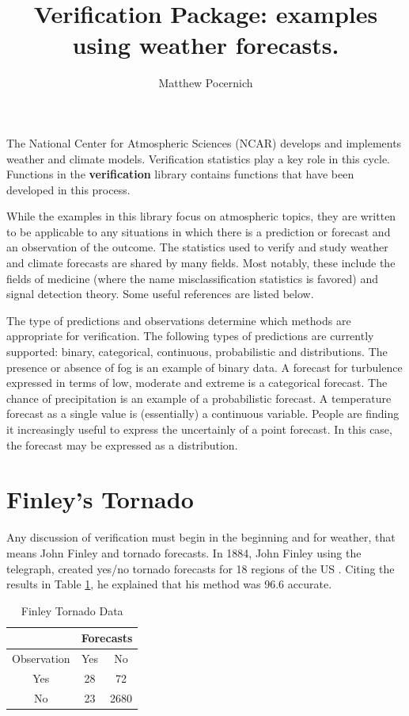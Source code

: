 \documentclass{article}
\title{Verification Package: examples using weather forecasts.}
\author{Matthew Pocernich}
\begin{document}
\maketitle
The National Center for Atmospheric Sciences (NCAR) develops and
implements weather and climate models.
Verification statistics play a key role in this cycle.
Functions in the \textbf{verification} library contains functions that 
have been developed in this process. 

While the examples in this library focus on atmospheric topics,
they are written to be applicable to any situations in which there is
a prediction or forecast and an observation of the outcome.  The
statistics used to verify and study weather and climate forecasts are
shared by many fields.  Most notably, these include the fields of
medicine (where the name misclassification statistics is favored) and
signal detection theory.  Some useful references are listed below.   

The type of predictions and observations determine which methods 
are appropriate for verification. The following types of predictions are currently supported:
binary, categorical, continuous, probabilistic and distributions.  
The presence or absence of fog is an example of binary data. A
forecast for turbulence expressed in terms of low, moderate and
extreme is a categorical forecast. The
chance of precipitation is an example of a probabilistic forecast.  A
temperature forecast as a single value is (essentially) a continuous variable.
People are finding it increasingly useful to express
the uncertainly of a point forecast.  In this case, the forecast may
be expressed as a distribution. 

\section{Finley's Tornado}

Any discussion of verification must begin in the beginning and for
weather, that means John Finley and tornado forecasts.  In 1884, John
Finley using the telegraph, created yes/no tornado forecasts for 18
regions of the US \cite{finley84}.  Citing the results in Table
\ref{fin}, he explained that his method was 96.6 accurate.
     
\begin{table}[H]
\begin{center}
 \caption{\label{fin}Finley Tornado Data  }
\begin{tabular}{|c||c|c|} \hline 
&  \multicolumn{2}{c}{Forecasts}\\ \hline
Observation& Yes & No \\ \hline
Yes & 28 &72  \\
No &  23 & 2680 \\ \hline
\end{tabular}
\end{center}
\end{table}  
\end{document}
